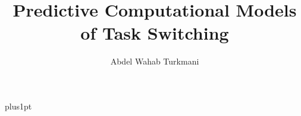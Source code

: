 \documentclass[12pt]{ociamthesis}
\title{Predictive Computational Models\\[1ex]     %
        of Task Switching}   %
\author{Abdel Wahab Turkmani}             %
\begin{document}
\baselineskip=18pt plus1pt

\setcounter{secnumdepth}{6}
\setcounter{tocdepth}{6}

\maketitle                  %

\begin{romanpages}          %
\tableofcontents            %
\listoffigures              %
\end{romanpages}            %









\appendix



\end{document}
